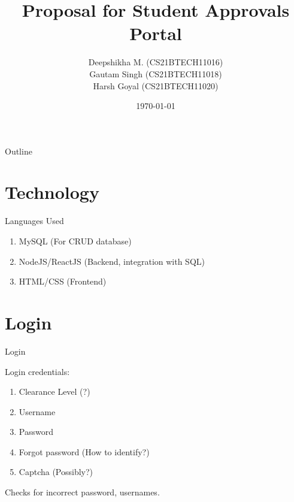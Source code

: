 \documentclass{beamer}
\title{Proposal for Student Approvals Portal}
\author[Deepshikha M. (CS21BTECH11016)]{Deepshikha M. (CS21BTECH11016) \\
Gautam Singh (CS21BTECH11018) \\
Harsh Goyal (CS21BTECH11020)}
\date{\today}
\begin{document}
\begin{frame}
    \titlepage 
\end{frame}

\begin{frame}{Outline}
    \tableofcontents
\end{frame}

\section{Technology}
\begin{frame}{Languages Used}
\begin{enumerate}
\item MySQL (For CRUD database)
\item NodeJS/ReactJS (Backend, integration with SQL)
\item HTML/CSS (Frontend)
\end{enumerate}
\end{frame}

\section{Login}
\begin{frame}{Login}

Login credentials:

\begin{enumerate}
\item Clearance Level (?)
\item Username
\item Password
\item Forgot password (How to identify?)
\item Captcha (Possibly?)
\end{enumerate}

Checks for incorrect password, usernames.
\end{frame}
\end{document}
